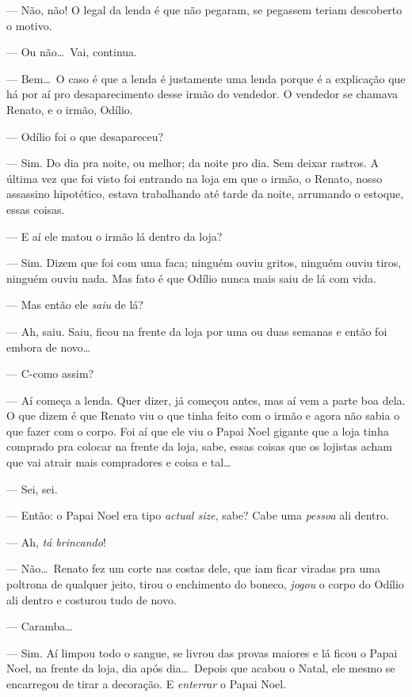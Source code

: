 --- Não, não! O legal da lenda é que não pegaram, se pegassem teriam descoberto o motivo.

--- Ou não\ldots \ Vai, continua.

--- Bem\ldots \ O caso é que a lenda é justamente uma lenda porque é a explicação que há por aí pro desaparecimento desse irmão do vendedor. O vendedor se chamava Renato, e o irmão, Odílio.

--- Odílio foi o que desapareceu?

--- Sim. Do dia pra noite, ou melhor; da noite pro dia. Sem deixar rastros. A última vez que foi visto foi entrando na loja em que o irmão, o Renato, nosso assassino hipotético, estava trabalhando até tarde da noite, arrumando o estoque, essas coisas.

--- E aí ele matou o irmão lá dentro da loja?

--- Sim. Dizem que foi com uma faca; ninguém ouviu gritos, ninguém ouviu tiros, ninguém ouviu nada. Mas fato é que Odílio nunca mais saiu de lá com vida.

--- Mas então ele \emph{saiu} de lá?

--- Ah, saiu. Saiu, ficou na frente da loja por uma ou duas semanas e então foi embora de novo\ldots

--- C-como assim?

--- Aí começa a lenda. Quer dizer, já começou antes, mas aí vem a parte boa dela. O que dizem é que Renato viu o que tinha feito com o irmão e agora não sabia o que fazer com o corpo. Foi aí que ele viu o Papai Noel gigante que a loja tinha comprado pra colocar na frente da loja, sabe, essas coisas que os lojistas acham que vai atrair mais compradores e coisa e tal\ldots

--- Sei, sei.

--- Então: o Papai Noel era tipo \emph{actual size}, sabe? Cabe uma \emph{pessoa} ali dentro.

--- Ah, \emph{tá brincando}!

--- Não\ldots \ Renato fez um corte nas costas dele, que iam ficar viradas pra uma poltrona de qualquer jeito, tirou o enchimento do boneco, \emph{jogou} o corpo do Odílio ali dentro e costurou tudo de novo.

--- Caramba\ldots

--- Sim. Aí limpou todo o sangue, se livrou das provas maiores e lá ficou o Papai Noel, na frente da loja, dia após dia\ldots \ Depois que acabou o Natal, ele mesmo se encarregou de tirar a decoração. E \emph{enterrar} o Papai Noel.

